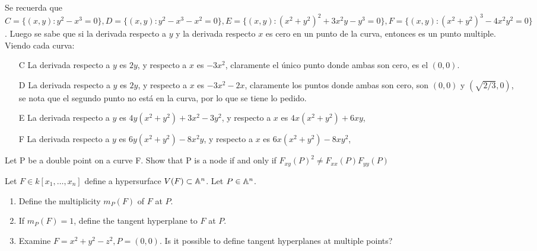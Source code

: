 \begin{sol}{3.1}
    Se recuerda que \(C=\{(x,y):y^2-x^3=0\},D=\{(x,y):y^2-x^3-x^2=0\},E=\{(x,y):(x^2+y^2)^2+3x^2y-y^3=0\},F=\{(x,y):(x^2+y^2)^3-4x^2y^2=0\}\). Luego se sabe que si la derivada respecto a \(y\) y la derivada respecto \(x\) es cero en un punto de la curva, entonces es un punto multiple. Viendo cada curva:
    \begin{itemize}
        \item[C] La derivada respecto a \(y\) es \(2y\), y respecto a \(x\) es \(-3x^2\), claramente el único punto donde ambas son cero, es el \((0,0)\).
        \item[D] La derivada respecto a \(y\) es \(2y\), y respecto a \(x\) es \(-3x^2-2x\), claramente los puntos donde ambas son cero, son \((0,0)\) y \((\sqrt{2/3},0)\), se nota que el segundo punto no está en la curva, por lo que se tiene lo pedido.
        \item[E] La derivada respecto a \(y\) es \(4y(x^2+y^2)+3x^2-3y^2\), y respecto a \(x\) es \(4x(x^2+y^2)+6xy\),
        \item[F] La derivada respecto a \(y\) es \(6y(x^2+y^2)-8x^2y\), y respecto a \(x\) es \(6x(x^2+y^2)-8xy^2\),
    \end{itemize}
\end{sol}

\begin{prob}{3.4}
    Let P be a double point on a curve F. Show that P is a node if and only if \(F_{xy}(P)^2\neq F_{xx}(P)F_{yy}(P)\)
\end{prob}

\begin{sol}{3.4}

\end{sol}

\begin{prob}{3.9}
    Let \(F\in k[x_1,\dots,x_n]\) define a hypersurface \(V(F)\subset\mathbb{A}^n\). Let \(P\in\mathbb{A}^n\).
    \begin{enumerate}
        \item Define the multiplicity \(m_P(F)\) of \(F\) at \(P\).
        \item If \(m_P(F)=1\), define the tangent hyperplane to \(F\)  at \(P\).
        \item Examine \(F=x^2+y^2-z^2,P=(0,0)\). Is it possible to define tangent hyperplanes at multiple points?
    \end{enumerate}
\end{prob}

